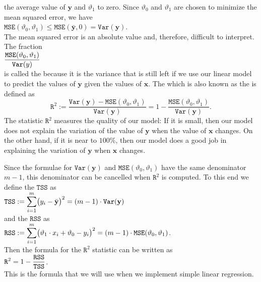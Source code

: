 the average value of $\mathbf{y}$ and $\vartheta_1$ to zero.  Since $\vartheta_0$ and $\vartheta_1$ are chosen to
minimize the mean squared error, we have
\\[0.2cm]
\hspace*{1.3cm}
$\mathtt{MSE}(\vartheta_0, \vartheta_1) \leq \mathtt{MSE}(\bar{\mathbf{y}}, 0) = \mathtt{Var}(\mathbf{y})$.
\\[0.2cm]
The mean squared error is an absolute value and, therefore, difficult to interpret.  The fraction
\\[0.2cm]
\hspace*{1.3cm}
$\displaystyle \frac{\mathtt{MSE}(\vartheta_0, \vartheta_1)}{\mathtt{Var}(y)}$
\\[0.2cm]
is called the  
because it is the variance that is still
left if we use our linear model to predict the values of $\mathbf{y}$ given the values of $\mathbf{x}$.  The
 
which is also known as the   is defined as 
\begin{equation}
  \label{eq:Rsquare}
  \mathtt{R}^2 := \frac{\mathtt{Var}(\mathbf{y}) - \mathtt{MSE}(\vartheta_0, \vartheta_1)}{\mathtt{Var}(\mathbf{y})} 
                = 1 - \frac{\mathtt{MSE}(\vartheta_0, \vartheta_1)}{\mathtt{Var}(\mathbf{y})}.
\end{equation}
The statistic $\mathtt{R}^2$ measures the quality of our
model: If it is small, then our model does not explain the variation of the value of $\mathbf{y}$ when the value of $\mathbf{x}$
changes.  On the other hand, if it is near to $100\%$, then our model does a good job in explaining the 
variation of $\mathbf{y}$ when $\mathbf{x}$ changes.

Since the formulae for $\mathtt{Var}(\mathbf{y})$ and $\mathtt{MSE}(\vartheta_0, \vartheta_1)$ have the same
denominator $m-1$, this denominator can be cancelled when $\mathtt{R}^2$ is computed.  To this
end we define the  $\mathtt{TSS}$   as
\\[0.2cm]
\hspace*{1.3cm}
$\displaystyle\mathtt{TSS} := \sum\limits_{i=1}^m \bigl(y_i - \bar{\mathbf{y}}\bigr)^2 = (m-1) \cdot \mathtt{Var}(\mathbf{y})$
\\[0.2cm]
and the   $\mathtt{RSS}$  as
\\[0.2cm]
\hspace*{1.3cm}
$\displaystyle\mathtt{RSS} := \sum\limits_{i=1}^m \bigl(\vartheta_1 \cdot x_i + \vartheta_0 - y_i\bigr)^2
                  = (m-1) \cdot \mathtt{MSE}(\vartheta_0, \vartheta_1)
$.
\\[0.2cm]
Then the formula for the $\mathtt{R}^2$ statistic can be written as
\\[0.2cm]
\hspace*{1.3cm}
$\displaystyle \mathtt{R}^2 = 1 - \frac{\mathtt{RSS}}{\mathtt{TSS}}$.
\\[0.2cm]
This is the formula that we will use when we implement simple linear regression.

